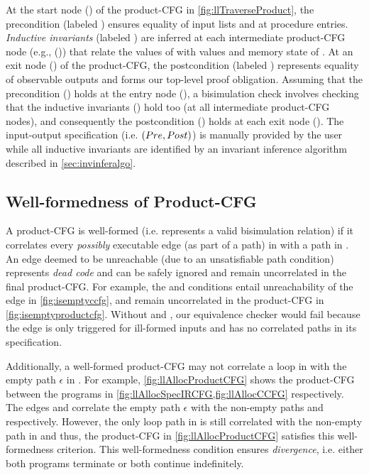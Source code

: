 At the start node () of the product-CFG in \cref{fig:llTraverseProduct},
the precondition \pre{} (labeled )
ensures equality of input lists  and  at procedure entries.
{\em Inductive invariants} (labeled ) are inferred
at each intermediate product-CFG node (e.g., ()) that relate
the values of \sprog{} with values and memory state of \cprog{}.
At an exit node () of the product-CFG, the postcondition \post{} (labeled )
represents equality of observable outputs and forms our top-level proof obligation.
Assuming that the precondition \pre{} () holds at the entry node (),
a bisimulation check involves checking that the inductive invariants () hold too (at all intermediate product-CFG nodes),
and consequently the postcondition \post{} () holds at each exit node ().
The input-output specification (i.e. $({Pre}{},{Post}{})$) is manually provided by the user
while all inductive invariants are identified by an invariant inference algorithm described in \cref{sec:invinferalgo}.

\subsection{Well-formedness of Product-CFG}
\label{sec:wellformedproductcfg}
A product-CFG is well-formed (i.e. represents a valid bisimulation relation) if it correlates every {\em possibly} executable
edge (as part of a path) in \cprog{} with a path in \sprog{}.
An edge deemed to be unreachable (due to an unsatisfiable path condition) represents {\em dead code} and can be
safely ignored and remain uncorrelated in the final product-CFG.
For example, the \sdef{} and \pre{} conditions entail unreachability of the edge  in \cref{fig:isemptyccfg},
and remain uncorrelated in the product-CFG in \cref{fig:isemptyproductcfg}.
Without \sdef{} and \pre{}, our equivalence checker would fail because the edge  is only triggered for ill-formed
inputs and has no correlated paths in its specification.

Additionally, a well-formed product-CFG may not correlate a loop in \cprog{} with the empty path $\epsilon$ in \sprog{}.
For example, \cref{fig:llAllocProductCFG} shows the product-CFG between the programs
in \cref{fig:llAllocSpecIRCFG,fig:llAllocCCFG} respectively.
The edges  and  correlate the empty path $\epsilon$
with the non-empty paths  and  respectively.
However, the only loop path  in \cprog{} is still correlated with the non-empty path 
in \sprog{} and thus, the product-CFG in \cref{fig:llAllocProductCFG} satisfies this well-formedness criterion.
This well-formedness condition ensures {\em divergence}, i.e. either both programs terminate or
both continue indefinitely.


